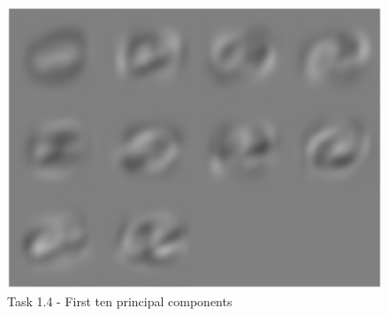 \documentclass{article}
\begin{document}
\newpage
\begin{figure}
\centering
	\includegraphics[width=170mm]{task1_4_imgs.eps}
	   \caption{Task 1.4 - First ten principal components}
\end{figure}
\end{document}
